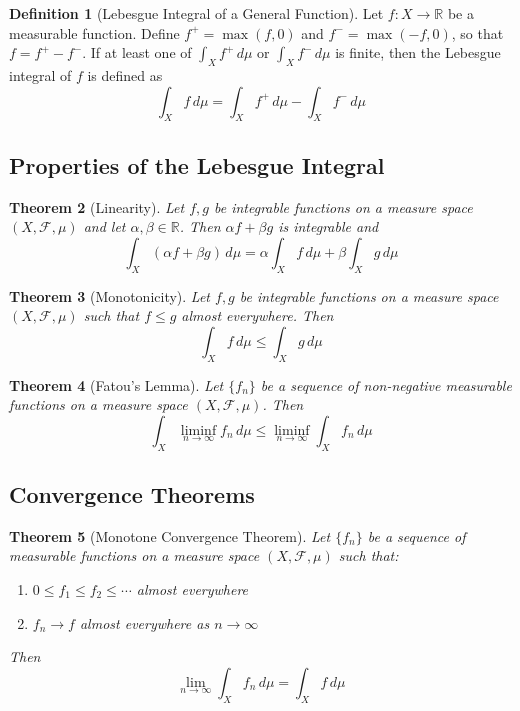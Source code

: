 \documentclass[12pt,a4paper]{article}
\theoremstyle{plain}
\newtheorem{theorem}{Theorem}[section]
\theoremstyle{definition}
\newtheorem{definition}[theorem]{Definition}
\begin{document}
\begin{definition}[Lebesgue Integral of a General Function]
Let $f: X \to \mathbb{R}$ be a measurable function. Define $f^+ = \max(f, 0)$ and $f^- = \max(-f, 0)$, so that $f = f^+ - f^-$. If at least one of $\int_X f^+ \, d\mu$ or $\int_X f^- \, d\mu$ is finite, then the Lebesgue integral of $f$ is defined as
\begin{equation}
\int_X f \, d\mu = \int_X f^+ \, d\mu - \int_X f^- \, d\mu
\end{equation}
\end{definition}

\subsection{Properties of the Lebesgue Integral}

\begin{theorem}[Linearity]
Let $f, g$ be integrable functions on a measure space $(X, \mathcal{F}, \mu)$ and let $\alpha, \beta \in \mathbb{R}$. Then $\alpha f + \beta g$ is integrable and
\begin{equation}
\int_X (\alpha f + \beta g) \, d\mu = \alpha \int_X f \, d\mu + \beta \int_X g \, d\mu
\end{equation}
\end{theorem}

\begin{theorem}[Monotonicity]
Let $f, g$ be integrable functions on a measure space $(X, \mathcal{F}, \mu)$ such that $f \leq g$ almost everywhere. Then
\begin{equation}
\int_X f \, d\mu \leq \int_X g \, d\mu
\end{equation}
\end{theorem}

\begin{theorem}[Fatou's Lemma]
Let $\{f_n\}$ be a sequence of non-negative measurable functions on a measure space $(X, \mathcal{F}, \mu)$. Then
\begin{equation}
\int_X \liminf_{n \to \infty} f_n \, d\mu \leq \liminf_{n \to \infty} \int_X f_n \, d\mu
\end{equation}
\end{theorem}

\subsection{Convergence Theorems}

\begin{theorem}[Monotone Convergence Theorem]
Let $\{f_n\}$ be a sequence of measurable functions on a measure space $(X, \mathcal{F}, \mu)$ such that:
\begin{enumerate}[label=(\roman*)]
\item $0 \leq f_1 \leq f_2 \leq \cdots$ almost everywhere
\item $f_n \to f$ almost everywhere as $n \to \infty$
\end{enumerate}
Then
\begin{equation}
\lim_{n \to \infty} \int_X f_n \, d\mu = \int_X f \, d\mu
\end{equation}
\end{theorem}
\end{document}
